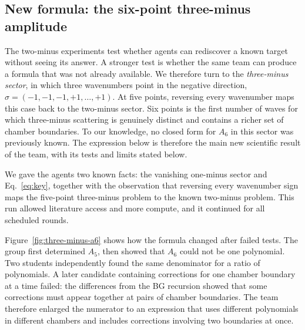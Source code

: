 \documentclass{article}
\begin{document}
\subsection{New formula: the six-point three-minus amplitude}
\label{sec:multiagent-three-minus}

The two-minus experiments test whether agents can rediscover a known target
without seeing its answer. A stronger test is whether the same team can
produce a formula that was not already available. We therefore turn to the
\emph{three-minus sector}, in which three wavenumbers point in the negative
direction,
$\sigma=(-1,-1,-1,+1,\ldots,+1)$. At five points, reversing every
wavenumber maps this case back to the two-minus sector. Six points is the first
number of waves for which three-minus scattering is genuinely distinct and
contains a richer set of chamber boundaries. To our knowledge, no closed
form for $A_6$ in this sector was previously known. The expression below is
therefore the main new scientific result of the team, with its tests and limits
stated below.

We gave the agents two known facts: the vanishing one-minus sector
and Eq.~\eqref{eq:key}, together with the observation that reversing every
wavenumber sign maps the five-point three-minus problem to the known two-minus problem.
This run allowed literature access and more compute, and it continued for all scheduled rounds.

Figure~\ref{fig:three-minus-a6} shows how the formula changed after failed
tests. The group first determined $A_5$, then
showed that $A_6$ could not be one polynomial. Two students independently found
the same denominator for a ratio of polynomials. A later candidate containing
corrections for one chamber boundary at a time failed: the differences from the BG
recursion showed that
some corrections must appear together at pairs of chamber boundaries.
The team therefore enlarged the numerator to an expression that uses different
polynomials in different chambers and includes corrections involving two
boundaries at once.
\end{document}
